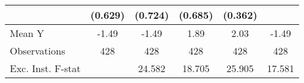 {\begin{tabular}{l*{5}{c}}
            &     (0.629)         &     (0.724)         &     (0.685)         &     (0.362)         &                     \\
\midrule
Mean Y      &       -1.49         &       -1.49         &        1.89         &        2.03         &       -1.49         \\
Observations&         428         &         428         &         428         &         428         &         428         \\
Exc. Inst. F-stat&                     &      24.582         &      18.705         &      25.905         &      17.581         \\
\bottomrule
\end{tabular}
}
